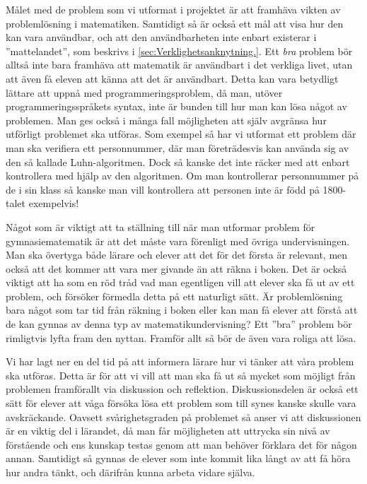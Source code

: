 \textcolor{Mahogany}{Målet med de problem som vi utformat i projektet är att framhäva vikten av problemlösning i matematiken. Samtidigt så är också ett mål att visa hur den kan vara användbar, och att den användbarheten inte enbart existerar i ''mattelandet'', som beskrivs i \ref{sec:Verklighetsanknytning.}. Ett \textit{bra} problem bör alltså inte bara framhäva att matematik är användbart i det verkliga livet, utan att även få eleven att känna att det är användbart. Detta kan vara betydligt lättare att uppnå med programmeringsproblem, då man, utöver programmeringsspråkets syntax, inte är bunden till hur man kan lösa något av problemen. Man ges också i många fall möjligheten att själv avgränsa hur utförligt problemet ska utföras. Som exempel så har vi utformat ett problem där man ska verifiera ett personnummer, där man företrädesvis kan använda sig av den så kallade Luhn-algoritmen\cite{Luhn}. Dock så kanske det inte räcker med att enbart kontrollera med hjälp av den algoritmen. Om man kontrollerar personnummer på de i sin klass så kanske man vill kontrollera att personen inte är född på 1800-talet exempelvis!}



 
\textcolor{Mahogany}{Något som är viktigt att ta ställning till när man utformar problem för gymnasiematematik är att det måste vara förenligt med övriga undervisningen. Man ska övertyga både lärare och elever att det för det första är relevant, men också att det kommer att vara mer givande än att räkna i boken. Det är också viktigt att ha som en röd tråd vad man egentligen vill att elever ska få ut av ett problem, och försöker förmedla detta på ett naturligt sätt. Är problemlösning bara något som tar tid från räkning i boken eller kan man få elever att förstå att de kan gynnas av denna typ av matematikundervisning? Ett ''bra'' problem bör rimligtvis lyfta fram den nyttan. Framför allt så bör de även vara roliga att lösa.}

\textcolor{Mahogany}{Vi har lagt ner en del tid på att informera lärare hur vi tänker att våra problem ska utföras. Detta är för att vi vill att man ska få ut så mycket som möjligt från problemen framförallt via diskussion och reflektion. Diskussionsdelen är också ett sätt för elever att våga försöka lösa ett problem som till synes kanske skulle vara avskräckande. Oavsett svårighetsgraden på problemet så anser vi att diskussionen är en viktig del i lärandet, då man får möjligheten att uttrycka sin nivå av förstående och ens kunskap testas genom att man behöver förklara det för någon annan. Samtidigt så gynnas de elever som inte kommit lika långt av att få höra hur andra tänkt, och därifrån kunna arbeta vidare själva.}

